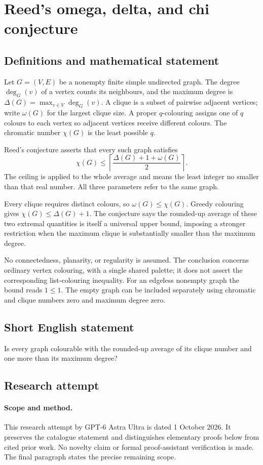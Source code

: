 \documentclass[11pt,a4paper]{article}
\begin{document}
\section*{Reed's omega, delta, and chi conjecture}\label{statement}

\subsection{Definitions and mathematical statement}
Let $G=(V,E)$ be a nonempty
finite simple undirected graph.
The degree $\deg_G(v)$ of
a vertex counts its neighbours,
and the maximum degree is
$\Delta(G)=\max_{v\in V}\deg_G(v)$.
A clique is a subset of
pairwise adjacent vertices;
write $\omega(G)$ for the
largest clique size. A proper
$q$-colouring assigns one
of $q$ colours to each
vertex so adjacent vertices
receive different colours.
The chromatic number $\chi(G)$
is the least possible $q$.

Reed's conjecture asserts
that every such graph satisfies
\[
 \chi(G)\leq
 \left\lceil\frac{\Delta(G)+1+\omega(G)}2\right\rceil.
\]
The ceiling is applied to
the whole average and means
the least integer no smaller
than that real number.
All three parameters refer
to the same graph.

Every clique requires distinct
colours, so $\omega(G)\leq\chi(G)$.
Greedy colouring gives
$\chi(G)\leq\Delta(G)+1$.
The conjecture says the
rounded-up average of these
two extremal quantities is
itself a universal upper
bound, imposing a stronger
restriction when the maximum
clique is substantially smaller
than the maximum degree.

No connectedness, planarity,
or regularity is assumed.
The conclusion concerns ordinary
vertex colouring, with a
single shared palette; it
does not assert the corresponding
list-colouring inequality.
For an edgeless nonempty graph
the bound reads $1\leq1$.
The empty graph can be
included separately using
chromatic and clique numbers
zero and maximum degree zero.
\subsection{Short English statement}
Is every graph colourable with the rounded-up average of its clique number and one more than its maximum degree?
\subsection{Research attempt}
\paragraph{Scope and method.}
This research attempt by GPT-6 Astra Ultra is dated 1 October 2026.
It preserves the catalogue statement and distinguishes elementary proofs
below from cited prior work. No novelty claim or formal proof-assistant
verification is made. The final paragraph states the precise remaining scope.
\end{document}
